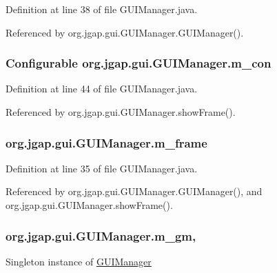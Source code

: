 Definition at line 38 of file G\-U\-I\-Manager.\-java.



Referenced by org.\-jgap.\-gui.\-G\-U\-I\-Manager.\-G\-U\-I\-Manager().

\hypertarget{classorg_1_1jgap_1_1gui_1_1_g_u_i_manager_a552bbfdfec67903d2562b0dda5c1a106}{
\subsubsection[{m\-\_\-con}]{\setlength{\rightskip}{0pt plus 5cm}Configurable org.\-jgap.\-gui.\-G\-U\-I\-Manager.\-m\-\_\-con\hspace{0.3cm}{\ttfamily [private]}}}\label{classorg_1_1jgap_1_1gui_1_1_g_u_i_manager_a552bbfdfec67903d2562b0dda5c1a106}


Definition at line 44 of file G\-U\-I\-Manager.\-java.



Referenced by org.\-jgap.\-gui.\-G\-U\-I\-Manager.\-show\-Frame().

\hypertarget{classorg_1_1jgap_1_1gui_1_1_g_u_i_manager_a6ae7de6827c208aab4ea850a14c5224f}{
\subsubsection[{m\-\_\-frame}]{ org.\-jgap.\-gui.\-G\-U\-I\-Manager.\-m\-\_\-frame\hspace{0.3cm}{\ttfamily [private]}}}\label{classorg_1_1jgap_1_1gui_1_1_g_u_i_manager_a6ae7de6827c208aab4ea850a14c5224f}


Definition at line 35 of file G\-U\-I\-Manager.\-java.



Referenced by org.\-jgap.\-gui.\-G\-U\-I\-Manager.\-G\-U\-I\-Manager(), and org.\-jgap.\-gui.\-G\-U\-I\-Manager.\-show\-Frame().

\hypertarget{classorg_1_1jgap_1_1gui_1_1_g_u_i_manager_a9727b831aa2af09f9a7f5e1f52f2b746}{
\subsubsection[{m\-\_\-gm}]{ org.\-jgap.\-gui.\-G\-U\-I\-Manager.\-m\-\_\-gm\hspace{0.3cm}{\ttfamily [static]}, {\ttfamily [private]}}}\label{classorg_1_1jgap_1_1gui_1_1_g_u_i_manager_a9727b831aa2af09f9a7f5e1f52f2b746}
Singleton instance of \hyperlink{classorg_1_1jgap_1_1gui_1_1_g_u_i_manager}{G\-U\-I\-Manager} 


